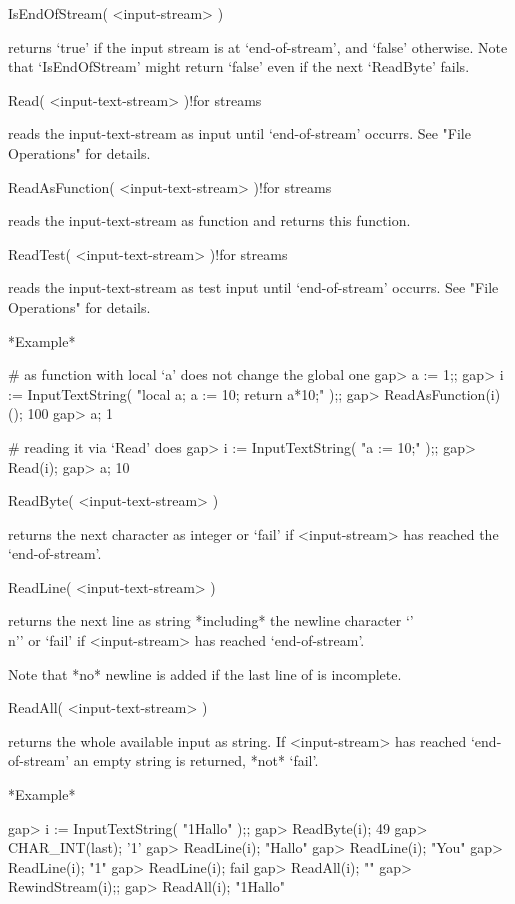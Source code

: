 
\>IsEndOfStream( <input-stream> )

returns `true' if  the input stream  is  at `end-of-stream', and  `false'
otherwise.  Note  that `IsEndOfStream' might return  `false' even  if the
next `ReadByte' fails.

\>Read( <input-text-stream> )!{for streams}

reads the input-text-stream as input  until `end-of-stream' occurrs.  See
"File Operations" for details.

\>ReadAsFunction( <input-text-stream> )!{for streams}

reads the input-text-stream as function and returns this function.

\>ReadTest( <input-text-stream> )!{for streams}

reads the input-text-stream as  test input until `end-of-stream' occurrs.
See "File Operations" for details.

*Example*

\beginexample
    # as function with local `a' does not change the global one
    gap> a := 1;;
    gap> i := InputTextString( "local a; a := 10; return a*10;" );;
    gap> ReadAsFunction(i)();
    100
    gap> a;
    1

    # reading it via `Read' does
    gap> i := InputTextString( "a := 10;" );;                      
    gap> Read(i);
    gap> a;
    10
\endexample

\>ReadByte( <input-text-stream> )

returns the  next character as  integer  or `fail'  if <input-stream> has
reached the `end-of-stream'.

\>ReadLine( <input-text-stream> )

returns  the   next line as   string  *including*  the  newline character
`{'\\n'}' or `fail' if <input-stream> has reached `end-of-stream'.

Note that *no* newline is added if the last line of is incomplete.

\>ReadAll( <input-text-stream> )

returns   the  whole available input as    string.  If <input-stream> has
reached `end-of-stream' an empty string is returned, *not* `fail'.

*Example*

\beginexample
    gap> i := InputTextString( "1Hallo\nYou{}" );;
    gap> ReadByte(i);
    49
    gap> CHAR_INT(last);
    '1'
    gap> ReadLine(i);
    "Hallo\n"
    gap> ReadLine(i);
    "You\n"
    gap> ReadLine(i);
    "1"
    gap> ReadLine(i);
    fail
    gap> ReadAll(i);
    ""
    gap> RewindStream(i);;
    gap> ReadAll(i);     
    "1Hallo\nYou{}"
\endexample

